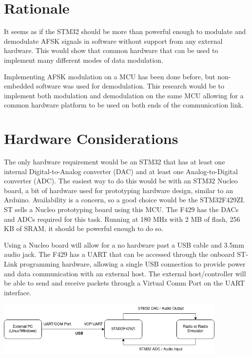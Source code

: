 \documentclass{article}[12pt,a4paper]
\begin{document}
\section*{Rationale}

It seems as if the STM32 should be more than powerful enough to modulate and demodulate AFSK signals in software without support from any external hardware. This would show that common hardware that can be used to implement many different modes of data modulation.

Implementing AFSK modulation on a MCU has been done before\cite{8475994}, but non-embedded software was used for demodulation. This research would be to implement both modulation and demodulation on the same MCU allowing for a common hardware platform to be used on both ends of the communication link.

\section*{Hardware Considerations}
The only hardware requirement would be an STM32 that has at least one internal Digital-to-Analog converter (DAC) and at least one Analog-to-Digital converter (ADC). The easiest way to do this would be with an STM32 Nucleo board, a bit of hardware used for prototyping hardware design, similar to an Arduino. Availability is a concern, so a good choice would be the STM32F429ZI. ST sells a Nucleo prototyping board using this MCU. The F429 has the DACs and ADCs required for this task. Running at 180 MHz with 2 MB of flash, 256 KB of SRAM, it should be powerful enough to do so.

Using a Nucleo board will allow for a no hardware past a USB cable and 3.5mm audio jack. The F429 has a UART that can be accessed through the onboard ST-Link programming hardware, allowing a single USB connection to provide power and data communication with an external host. The external host/controller will be able to send and receive packets through a Virtual Comm Port on the UART interface.

\begin{center}
  \includegraphics[width=4.5in]{images/hardware_outline.png}
\end{center}
\end{document}
